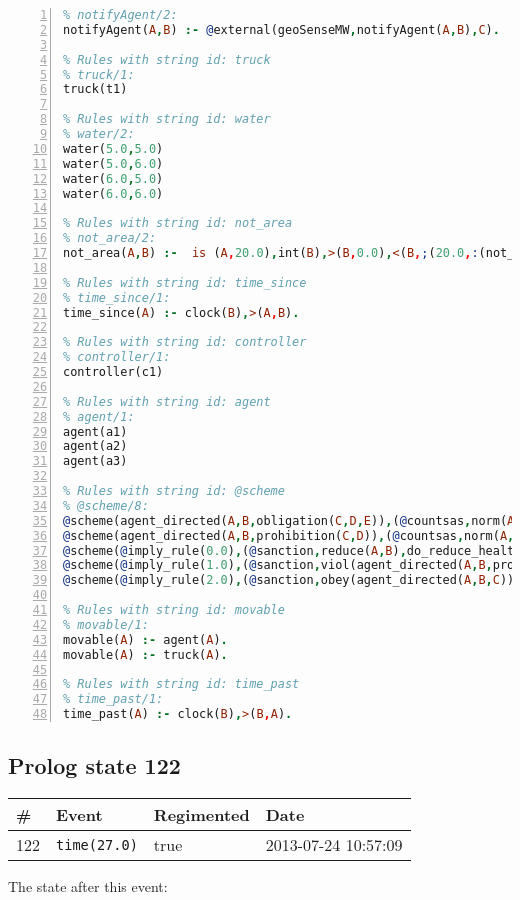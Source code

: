 \documentclass[11pt]{article}\usepackage[utf8]{inputenc}\usepackage{geometry}
\begin{document}
\begin{lstlisting}[language=Prolog, numbers=left]
% Rules with string id: notifyAgent
% notifyAgent/2:
notifyAgent(A,B) :- @external(geoSenseMW,notifyAgent(A,B),C).

% Rules with string id: truck
% truck/1:
truck(t1)

% Rules with string id: water
% water/2:
water(5.0,5.0)
water(5.0,6.0)
water(6.0,5.0)
water(6.0,6.0)

% Rules with string id: not_area
% not_area/2:
not_area(A,B) :-  is (A,20.0),int(B),>(B,0.0),<(B,;(20.0,:(not_area(A,B), is (-(B),20.0)))),int(A),>(A,0.0),<(A,;(20.0,:(area(A,B),-(int(A))))),int(B),>(A,0.0),>(B,0.0),<(A,21.0),<(B,21.0).

% Rules with string id: time_since
% time_since/1:
time_since(A) :- clock(B),>(A,B).

% Rules with string id: controller
% controller/1:
controller(c1)

% Rules with string id: agent
% agent/1:
agent(a1)
agent(a2)
agent(a3)

% Rules with string id: @scheme
% @scheme/8:
@scheme(agent_directed(A,B,obligation(C,D,E)),(@countsas,norm(A,B,F,obligation(C,D,E)),F),false,(listTrue(C)),(time_past(D)),false,[plus(viol(agent_directed(A,B,obligation(C,D,E))))|[]],[plus(obey(agent_directed(A,B,obligation(C,D,E))))|[]])
@scheme(agent_directed(A,B,prohibition(C,D)),(@countsas,norm(A,B,E,prohibition(C,D)),E),(listTrue(C)),false,(false),false,[plus(viol(agent_directed(A,B,prohibition(C,D))))|[]],[plus(obey(agent_directed(A,B,prohibition(C,D))))|[]])
@scheme(@imply_rule(0.0),(@sanction,reduce(A,B),do_reduce_health(A,B),notifyAgent(A,changed(status))),true,false,false,false,[min(reduce(A,B))|[]],[])
@scheme(@imply_rule(1.0),(@sanction,viol(agent_directed(A,B,prohibition(C,D))),do_sanction(D)),true,false,false,false,[min(viol(agent_directed(A,B,prohibition(C,D))))|[]],[])
@scheme(@imply_rule(2.0),(@sanction,obey(agent_directed(A,B,C))),true,false,false,false,[min(obey(agent_directed(A,B,C)))|[]],[])

% Rules with string id: movable
% movable/1:
movable(A) :- agent(A).
movable(A) :- truck(A).

% Rules with string id: time_past
% time_past/1:
time_past(A) :- clock(B),>(B,A).

\end{lstlisting}
\clearpage 
\subsection{Prolog state 122}
\begin{table}[ht]
\centering 
\begin{tabular}{l l l l} 
\textbf{\#} & \textbf{Event} & \textbf{Regimented} & \textbf{Date} \\ [0.5ex] 
\hline
122&\texttt{time(27.0)}&true&2013-07-24 10:57:09\\ [1ex] \hline\end{tabular}
\end{table}
The state after this event:
\end{document}
